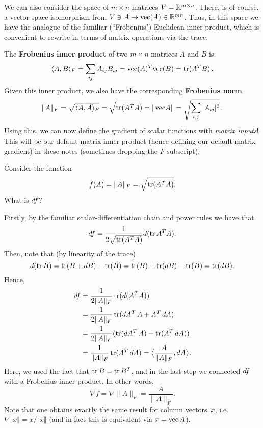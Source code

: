We can also consider the space of $m\times n$ matrices $V = \mathbb R^{m \times n}$. There, is of course, a vector-space isomorphism from $V \ni A \to \mathrm{vec}(A) \in \mathbb R^{mn}$. Thus, in this space we have the analogue of the familiar (``Frobenius") Euclidean inner product, which is convenient to rewrite in terms of matrix operations via the trace: 
\begin{definition}
The \textbf{Frobenius inner product} of two $m \times n$ matrices $A$ and $B$ is:
\[
\langle A, B \rangle_F = \sum_{ij} A_{ij} B_{ij} = \mathrm{vec}(A)^T \mathrm{vec}(B) = \operatorname{tr}(A^T B) \, .
\]
Given this inner product, we also have the corresponding \textbf{Frobenius norm}: $$\lVert A \rVert_F = \sqrt{\langle A,A \rangle_F} = \sqrt{\operatorname{tr}(A^TA)} = \lVert \mathrm{vec} A\rVert = \sqrt{\sum_{i,j} |A_{ij}|^2} \, .$$ 
Using this, we can now define the gradient of scalar functions with \textit{matrix inputs}!  This will be our default matrix inner product (hence defining our default matrix gradient) in these notes (sometimes dropping the $F$ subscript).
\end{definition}

\begin{example}
    Consider the function 
    \[
    f(A) = \lVert A \rVert_F = \sqrt{\operatorname{tr}(A^T A)}.
    \] What is $d f$?
\end{example}
Firstly, by the familiar scalar-differentiation chain and power rules we have that 
\[
d f = \frac{1}{2 \sqrt{\operatorname{tr}(A^T A)}} d (\operatorname{tr} A^T A).
\]
Then, note that (by linearity of the trace)
\[
d( \operatorname{tr} B) = \operatorname{tr}(B+d B) - \operatorname{tr}(B) = \operatorname{tr}(B) + \operatorname{tr}(d B) - \operatorname{tr}(B) = \operatorname{tr}(d B).
\]
Hence, 
\begin{align*}
    d f &= \frac{1}{2\lVert A\rVert_F} \operatorname{tr}(d (A^T A)) \\
    &= \frac{1}{2\lVert A\rVert_F} \operatorname{tr}( d A^T\, A + A^T\, d A) \\
    &= \frac{1}{2 \lVert A\rVert_F} (\operatorname{tr}(d A^T\, A) + \operatorname{tr}(A^T\, d A)) \\
    &= \frac{1}{\lVert A\rVert_F} \operatorname{tr}(A^T \, d A) = \big\langle \frac{A}{\lVert A\rVert_F} , d A \big\rangle.
\end{align*}
Here, we used the fact that $\operatorname{tr} B = \operatorname{tr} B^T$, and in the last step we connected $d f$ with a Frobenius inner product. In other words, 
\[
\nabla f = \nabla \lVert A \rVert_F = \frac{A}{\lVert A \rVert_F}.
\]
Note that one obtains exactly the same result for column vectors~$x$, i.e.~$\nabla \Vert x\Vert = x/\Vert x \Vert$ (and in fact this is equivalent via $x = \operatorname{vec} A$).


